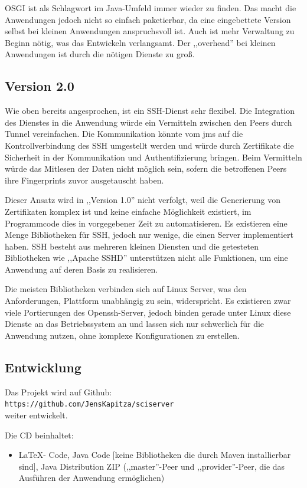 \documentclass[oneside, ngerman, toc=bibliography,bibliography=totoc,listof=entryprefix, open=right,numbers=noenddot,fontsize=12pt]{scrbook}
\begin{document}
OSGI ist als Schlagwort im Java-Umfeld immer wieder zu finden. Das macht die Anwendungen jedoch nicht so einfach paketierbar, da eine eingebettete Version selbst bei kleinen Anwendungen anspruchsvoll ist. Auch ist mehr Verwaltung zu Beginn nötig, was das Entwickeln verlangsamt. Der ,,overhead'' bei kleinen Anwendungen ist durch die nötigen Dienste zu groß.

\subsection{Version 2.0}
Wie oben bereits angesprochen, ist ein SSH-Dienst sehr flexibel. Die Integration des Dienstes in die Anwendung würde ein Vermitteln zwischen den Peers durch Tunnel vereinfachen. Die Kommunikation könnte vom \acrshort{jms} auf die Kontrollverbindung des SSH umgestellt werden und würde durch Zertifikate die Sicherheit in der Kommunikation und Authentifizierung bringen. Beim Vermitteln würde das Mitlesen der Daten nicht möglich sein, sofern die betroffenen Peers ihre Fingerprints zuvor ausgetauscht haben.

Dieser Ansatz wird in ,,Version 1.0'' nicht verfolgt, weil die Generierung von Zertifikaten komplex ist und keine einfache Möglichkeit existiert, im Programmcode dies in vorgegebener Zeit zu automatisieren.
Es existieren eine Menge Bibliotheken für SSH, jedoch nur wenige, die einen Server implementiert haben.
SSH besteht aus mehreren kleinen Diensten und die getesteten Bibliotheken wie ,,Apache SSHD'' unterstützen nicht alle Funktionen, um eine Anwendung auf deren Basis zu realisieren.

Die meisten Bibliotheken verbinden sich auf Linux Server, was den Anforderungen, Plattform unabhängig zu sein, widerspricht. Es existieren zwar viele Portierungen des Openssh-Server, jedoch binden gerade unter Linux diese Dienste an das Betriebssystem an und lassen sich nur schwerlich für die Anwendung nutzen, ohne komplexe Konfigurationen zu erstellen.

\subsection{Entwicklung}
Das Projekt wird auf Github:\\
 \verb|https://github.com/JensKapitza/sciserver| \\ 
weiter entwickelt.

Die CD beinhaltet:
\begin{itemize}
    \item \LaTeX - Code, Java Code [keine Bibliotheken die durch Maven installierbar sind], Java Distribution ZIP (,,master''-Peer und ,,provider''-Peer, die das Ausführen der Anwendung ermöglichen)
\end{itemize}
\end{document}
